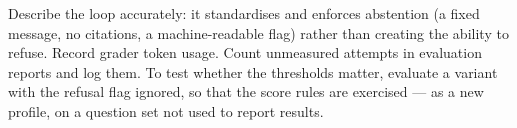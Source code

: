 \begin{recommended}
Describe the loop accurately: it standardises and enforces abstention (a fixed message, no citations, a machine-readable flag) rather than creating the ability to refuse. Record grader token usage. Count unmeasured attempts in evaluation reports and log them. To test whether the thresholds matter, evaluate a variant with the refusal flag ignored, so that the score rules are exercised --- as a new profile, on a question set not used to report results.
\end{recommended}
